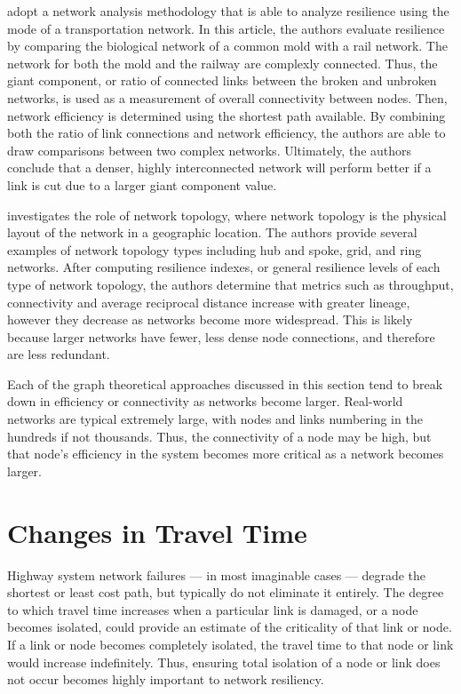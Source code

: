 \citet{osei2014} adopt a network analysis methodology that is able to
analyze
resilience using the mode of a transportation network. In this
article, the authors evaluate resilience by comparing the biological
network of a common mold
with a rail network. The network for both the mold and the railway are
complexly connected. Thus, the giant component, or ratio of connected links
between the broken and unbroken networks, is used as a measurement of overall
connectivity between nodes. Then, network efficiency is determined using the
shortest path available. By combining both the ratio of link connections and
network efficiency, the authors are able to draw comparisons between two
complex networks. Ultimately, the authors conclude that a denser, highly
interconnected network will perform better if a link is cut due to a larger giant component value.

\citet{zhang2015.2} investigates the role of network topology, where network topology is the physical layout of the network in a geographic location.
The authors provide several examples of network topology types including
hub and spoke, grid, and
ring networks. After computing resilience indexes, or general resilience
levels of each type of
network topology, the authors determine that metrics such as throughput,
connectivity and average
reciprocal distance increase with greater lineage, however they decrease as
networks become
more widespread. This is likely because larger networks have fewer, less dense node
connections, and
therefore are less redundant.

Each of the graph theoretical approaches discussed in this section tend to break
down in efficiency or connectivity as networks become larger. Real-world
networks are typical extremely large, with nodes and links numbering in the
hundreds if not thousands. Thus, the connectivity of a node may be high,
but that node's efficiency in the system becomes more critical as a network
becomes larger.

\section{Changes in Travel Time}

Highway system network failures --- in most imaginable cases --- degrade
the
shortest or least cost path, but typically do not eliminate it entirely.
The degree
to which travel time increases when a particular link is damaged, or a node
becomes isolated, could
provide an estimate of the criticality of that link or node. If a link or node
becomes completely isolated, the travel time to that node or link would
increase indefinitely. Thus, ensuring total isolation of a node or link does
not occur becomes highly important to network resiliency.

